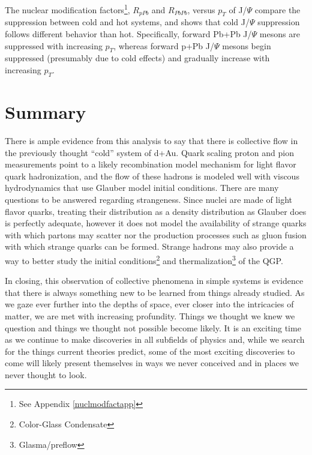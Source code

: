 The nuclear modification factors\footnote{See Appendix \ref{nuclmodfactapp}}, $R_{pPb}$ and $R_{PbPb}$, versus $p_T$ of J/$\Psi$ compare the suppression between cold and hot systems, and shows that cold J/$\Psi$ suppression follows different behavior than hot. \citep{1742-6596-668-1-012049} Specifically, forward Pb+Pb J/$\Psi$ mesons are suppressed with increasing $p_T$, whereas forward p+Pb J/$\Psi$ mesons begin suppressed (presumably due to cold effects) and gradually increase with increasing $p_T$. 

\section{Summary}
There is ample evidence from this analysis to say that there is collective flow in the previously thought ``cold'' system of d+Au. Quark scaling proton and pion measurements point to a likely recombination model mechanism for light flavor quark hadronization, and the flow of these hadrons is modeled well with viscous hydrodynamics that use Glauber model initial conditions. There are many questions to be answered regarding strangeness. Since nuclei are made of light flavor quarks, treating their distribution as a density distribution as Glauber does is perfectly adequate, however it does not model the availability of strange quarks with which partons may scatter nor the production processes such as gluon fusion with which strange quarks can be formed. Strange hadrons may also provide a way to better study the initial conditions\footnote{Color-Glass Condensate} and thermalization\footnote{Glasma/preflow} of the QGP. 

In closing, this observation of collective phenomena in simple systems is evidence that there is always something new to be learned from things already studied. As we gaze ever further into the depths of space, ever closer into the intricacies of matter, we are met with increasing profundity. Things we thought we knew we question and things we thought not possible become likely. It is an exciting time as we continue to make discoveries in all subfields of physics and, while we search for the things current theories predict, some of the most exciting discoveries to come will likely present themselves in ways we never conceived and in places we never thought to look. 

\pagebreak
\pagebreak


